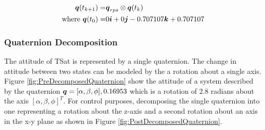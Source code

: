 \begin{equation}
  \begin{aligned}
    \boldsymbol{q}(t_{k+1}) = & \boldsymbol{q}_{rps} \otimes \boldsymbol{q}(t_{k}) \\
    \text{where } \boldsymbol{q}(t_0) = & 0 \boldsymbol{i} +0 \boldsymbol{j} -0.707107 \boldsymbol{k} +0.707107
  \end{aligned}
  \label{eqn:3rpmQuaternionEquation}
\end{equation}

\subsubsection{Quaternion Decomposition}
\label{subsubsec:QuaternionDecomposition}

The attitude of TSat is represented by a single quaternion.  The change in attitude between two states can be modeled by the a rotation about a single axis.  Figure \ref{fig:PreDecomposedQuaternion} show the attitude of a system described by the quaternion $\boldsymbol{q} = [\alpha, \beta, \phi], 0.16953$ which is a rotation of 2.8 radians about the axis $[\alpha, \beta, \phi]^T$.  For control purposes, decomposing the single quaternion into one representing a rotation about the z-axis and a second rotation about an axis in the x-y plane as shown in Figure \ref{fig:PostDecomposedQuaternion}.

